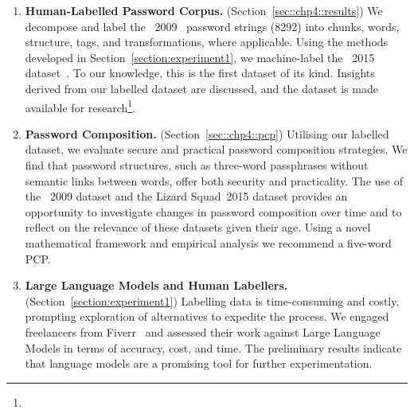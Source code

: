 \begin{enumerate}
\item \textbf{Human-Labelled Password Corpus.} (Section~\ref{sec::chp4::results}) We decompose and label the \hmail~2009~\cite{miessler_hotmail_2009} password strings (\num{8292}) into chunks, words, structure, tags, and transformations, where applicable. Using the methods developed in Section~\ref{section:experiment1}, we machine-label the \lizardsquad~2015 dataset~\cite{miessler_lizardsquad_2015}. To our knowledge, this is the first dataset of its kind. Insights derived from our labelled dataset are discussed, and the dataset is made available for research\footnote{\passwordNinjaURL}.

\item \textbf{Password Composition.} (Section~\ref{sec::chp4::pcp}) Utilising our labelled dataset, we evaluate secure and practical password composition strategies. We find that password structures, such as three-word passphrases without semantic links between words, offer both security and practicality. The use of the \hmail~2009 dataset and the Lizard Squad~2015 dataset provides an opportunity to investigate changes in password composition over time and to reflect on the relevance of these datasets given their age. Using a novel mathematical framework and empirical analysis we recommend a five-word PCP.

\item \textbf{Large Language Models and Human Labellers.} (Section~\ref{section:experiment1}) Labelling data is time-consuming and costly, prompting exploration of alternatives to expedite the process. We engaged freelancers from Fiverr~\cite{fiverr2024} and assessed their work against Large Language Models in terms of accuracy, cost, and time. The preliminary results indicate that language models are a promising tool for further experimentation.
\end{enumerate}